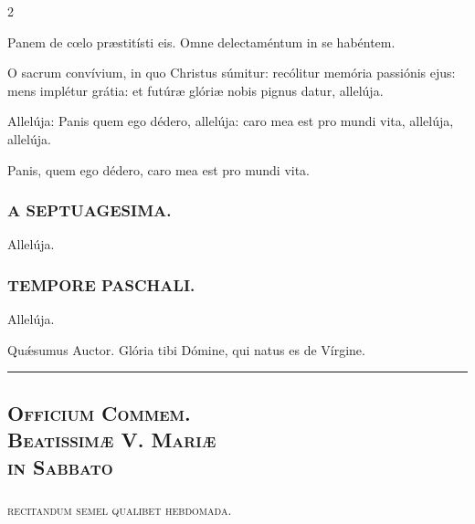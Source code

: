 \documentclass[9pt,twoside]{extarticle}
\begin{document}
\begin{multicols}{2}
\begin{tightlist}{}
\item {} Panem de cœlo præstitísti eis.  Omne delectaméntum in se habéntem.
\item {} O sacrum convívium, in quo Christus súmitur: recólitur memória passiónis ejus: mens implétur grátia: et futúræ glóriæ nobis pignus datur, allelúja.
\item {} Allelúja: Panis quem ego dédero, allelúja: caro mea est pro mundi vita, allelúja, allelúja.
\item {} Panis, quem ego dédero, caro mea est pro mundi vita.
\end{tightlist}

\subsubsection*{\center \textsc{A SEPTUAGESIMA.}}
\noindent {} Allelúja.

\subsubsection*{\center \textsc{TEMPORE PASCHALI.}}
\begin{tightlist}{}
\item {} Allelúja.
\item {} Quǽsumus Auctor.  Glória tibi Dómine, qui natus es de Vírgine.
\end{tightlist}
\begin{center}\textcolor{red}{\rule{\linewidth}{0.5pt}} \end{center}

\subsection*{\center \textsc{Officium Commem.\\ Beatissimæ V. Mariæ\\ in Sabbato}}
\subsubsection*{\center {}}
\begin{center}\textsc{recitandum semel qualibet hebdomada.}\end{center}

\end{multicols}
\end{document}
